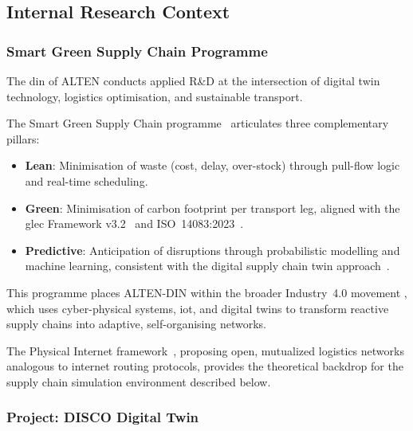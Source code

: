 \subsection{Internal Research Context}

\subsubsection{Smart Green Supply Chain Programme}


The \gls{din} of ALTEN conducts applied R\&D at the
intersection of digital twin technology, logistics optimisation, and sustainable
transport. 

The Smart Green Supply Chain programme~\autocite{benzakour2024history}
articulates three complementary pillars:

\begin{itemize}
    \item \textbf{Lean}: Minimisation of waste (cost, delay, over-stock) through
          pull-flow logic and real-time scheduling.
    \item \textbf{Green}: Minimisation of carbon footprint per transport leg, aligned with the \gls{glec} Framework v3.2~\autocite{smartfreight2023glec} and ISO~14083:2023~\autocite{iso14083}.
    \item \textbf{Predictive}: Anticipation of disruptions through probabilistic modelling and machine learning, consistent with the digital supply chain twin approach~\autocite{ivanov2020digital}.
\end{itemize}

This programme places ALTEN-DIN within the broader Industry~4.0 movement \autocite{kagermann2013industry}, which uses cyber-physical systems, \gls{iot}, and
digital twins to transform reactive supply chains into adaptive, self-organising networks.

The Physical Internet framework~\autocite{montreuil2011toward}, proposing
open, mutualized logistics networks analogous to internet routing protocols, provides the theoretical backdrop for the supply chain simulation environment described below.

\subsubsection{Project: DISCO Digital Twin}

